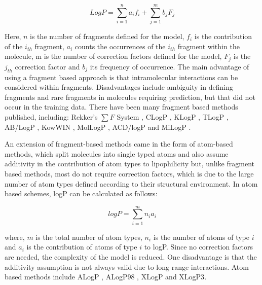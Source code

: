 \documentclass[10pt]{bmc_article}
\newenvironment{bmcformat}{\begin{raggedright}\baselineskip20pt\sloppy\setboolean{publ}{false}}{\end{raggedright}\baselineskip20pt\sloppy}
\begin{document}
\begin{bmcformat}
\begin{equation}
  \label{eq:logP_fragment}
  LogP = \sum_{i=1}^n a_i f_i + \sum_{j=1}^m b_j F_j
\end{equation}

Here, $n$ is the number of fragments defined for the model, $f_i$ is the contribution of the $i_{th}$ fragment, $a_i$ counts the occurrences of the $i_{th}$ fragment within the molecule, m is the number of correction factors defined for the model, $F_j$ is the $j_{th}$ correction factor and $b_j$ its frequency of occurrence. The main advantage of using a fragment based approach is that intramolecular interactions can be considered within fragments. Disadvantages include ambiguity in defining fragments and rare fragments in molecules requiring prediction, but that did not occur in the training data. There have been many fragment based methods published, including: Rekker's $\sum F$ System \cite{rekker_calculation_1992}, CLogP \cite{leo_partition_1971, hansch_substituent_1979, leo_calculating_1993}, KLogP \cite{klopman_computer_1994}, TLogP \cite{junghans_estimation_1997}, AB/LogP \cite{japertas_fragmental_2002}, KowWIN \cite{meylan_estimating_2000}, MolLogP \cite{_molsoft_2013}, ACD/logP \cite{petrauskas_acd/log_2000} and MiLogP \cite{_molinspiratoin_2013}.

An extension of fragment-based methods came in the form of atom-based methods, which split molecules into single typed atoms and also assume additivity in the contribution of atom types to lipophilicity but, unlike fragment based methods, most do not require correction factors, which is due to the large number of atom types defined according to their structural environment\cite{mannhold_calculation_2009}. In atom based schemes, logP can be calculated as follows:

\begin{equation}
  \label{eq:logP_atom}
  logP = \sum_{i=1}^m n_i a_i
\end{equation}

where, $m$ is the total number of atom types, $n_i$ is the number of atoms of type $i$ and $a_i$ is the contribution of atoms of type $i$ to logP. Since no correction factors are needed, the complexity of the model is reduced. One disadvantage is that the additivity assumption is not always valid due to long range interactions\cite{buchwald_octanol-water_1998}. Atom based methods include ALogP \cite{viswanadhan_atomic_1989}, ALogP98 \cite{wildman_prediction_1999}, XLogP \cite{wang_new_1997} and XLogP3\cite{cheng_computation_2007}.


\end{bmcformat}
\end{document}
